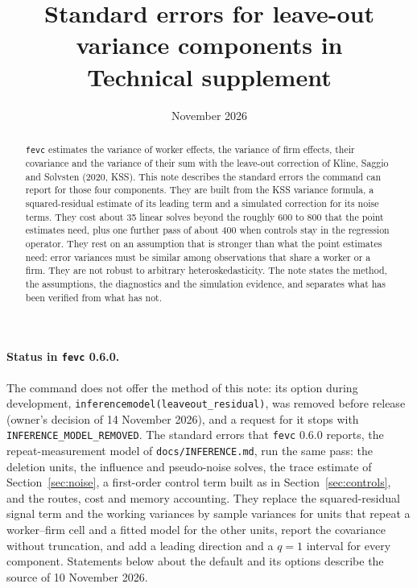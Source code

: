 \documentclass[11pt]{article}
\title{Standard errors for leave-out variance components in \fevc\\[4pt]
\large Technical supplement}
\author{}
\date{November 2026}
\newcommand{\fevc}{\texttt{fevc}}
\begin{document}
\maketitle

\begin{abstract}
\noindent \fevc{} estimates the variance of worker effects, the variance of
firm effects, their covariance and the variance of their sum with the
leave-out correction of Kline, Saggio and S{\o}lvsten (2020, KSS). This note
describes the standard errors the command can report for those four
components. They are built from the KSS variance formula, a squared-residual
estimate of its leading term and a simulated correction for its noise terms.
They cost about 35 linear solves beyond the roughly 600 to 800 that the point
estimates need, plus one further pass of about 400 when controls stay in the
regression operator. They rest on an assumption that is stronger than what the
point estimates need: error variances must be similar among observations
that share a worker or a firm. They are not robust to arbitrary
heteroskedasticity. The note states the method, the assumptions, the
diagnostics and the simulation evidence, and separates what has been
verified from what has not.
\end{abstract}

\begin{sloppypar}
\paragraph{Status in \fevc{} 0.6.0.} The command does not offer the method
of this note: its option during development,
\texttt{inferencemodel(leaveout\_\allowbreak residual)}, was removed before
release (owner's decision of 14 November 2026), and a request for it stops
with \texttt{INFERENCE\_\allowbreak MODEL\_\allowbreak REMOVED}.
The standard errors that \fevc{} 0.6.0 reports, the repeat-measurement
model of \texttt{docs/INFERENCE.md}, run the same pass: the deletion units,
the influence and pseudo-noise solves, the trace estimate of
Section~\ref{sec:noise}, a first-order control term built as in
Section~\ref{sec:controls}, and the routes, cost and memory accounting.
They replace the squared-residual
signal term and the working variances by sample variances for units that
repeat a worker--firm cell and a fitted model for the other units, report
the covariance without truncation, and add a leading direction and a $q=1$
interval for every component. Statements below about the default and its
options describe the source of 10 November 2026.
\end{sloppypar}
\end{document}
